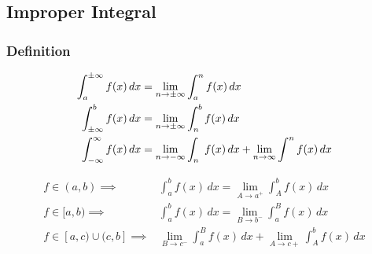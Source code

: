 	\subsection{Improper Integral}
	    \subsubsection{Definition}
			\begin{definition}[Unbounded]
				\begin{align*}
					\int_a^{\pm\infty} f(x)\,dx&=\lim_{n\to\pm\infty}\int_a^nf(x)\,dx\\
					\int_{\pm\infty}^bf(x)\,dx&=\lim_{n\to\pm\infty}\int_n^bf(x)\,dx\\
					\int_{-\infty}^\infty f(x)\,dx&=\lim_{n\to-\infty}\int_n^{\textcolor{\colo}c}f(x)\,dx+\lim_{n\to\infty}\int_{\textcolor{\colo}c}^nf(x)\,dx
				\end{align*}
			\end{definition}
			\begin{definition}[Discontinuity]
				\begin{align*}
					f\in(a,b)\implies&\int_a^bf(x)\,dx=\lim_{A\to a^+}\int_A^bf(x)\,dx\\
					f\in[a,b)\implies&\int_a^bf(x)\,dx=\lim_{B\to b^-}\int_a^Bf(x)\,dx\\
					f\in[a,c)\cup(c,b]\implies&\lim_{B\to c^-}\int_a^Bf(x)\,dx+\lim_{A\to c+}\int_A^bf(x)\,dx
				\end{align*}
			\end{definition}
